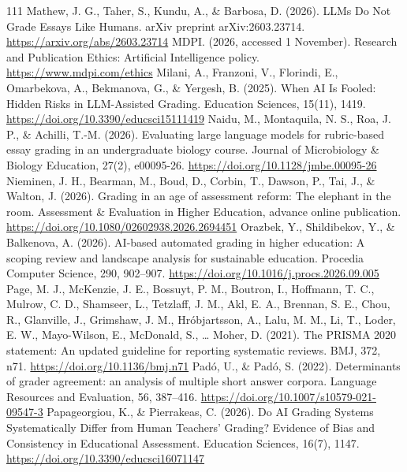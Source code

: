 \begin{thebibliography}{111}
 Mathew, J. G., Taher, S., Kundu, A., \& Barbosa, D. (2026). LLMs Do Not Grade Essays Like Humans. arXiv preprint arXiv:2603.23714. \url{https://arxiv.org/abs/2603.23714}
 MDPI. (2026, accessed 1 November). Research and Publication Ethics: Artificial Intelligence policy. \url{https://www.mdpi.com/ethics}
 Milani, A., Franzoni, V., Florindi, E., Omarbekova, A., Bekmanova, G., \& Yergesh, B. (2025). When AI Is Fooled: Hidden Risks in LLM-Assisted Grading. Education Sciences, 15(11), 1419. \url{https://doi.org/10.3390/educsci15111419}
 Naidu, M., Montaquila, N. S., Roa, J. P., \& Achilli, T.-M. (2026). Evaluating large language models for rubric-based essay grading in an undergraduate biology course. Journal of Microbiology \& Biology Education, 27(2), e00095-26. \url{https://doi.org/10.1128/jmbe.00095-26}
 Nieminen, J. H., Bearman, M., Boud, D., Corbin, T., Dawson, P., Tai, J., \& Walton, J. (2026). Grading in an age of assessment reform: The elephant in the room. Assessment \& Evaluation in Higher Education, advance online publication. \url{https://doi.org/10.1080/02602938.2026.2694451}
 Orazbek, Y., Shildibekov, Y., \& Balkenova, A. (2026). AI-based automated grading in higher education: A scoping review and landscape analysis for sustainable education. Procedia Computer Science, 290, 902--907. \url{https://doi.org/10.1016/j.procs.2026.09.005}
 Page, M. J., McKenzie, J. E., Bossuyt, P. M., Boutron, I., Hoffmann, T. C., Mulrow, C. D., Shamseer, L., Tetzlaff, J. M., Akl, E. A., Brennan, S. E., Chou, R., Glanville, J., Grimshaw, J. M., Hr\'objartsson, A., Lalu, M. M., Li, T., Loder, E. W., Mayo-Wilson, E., McDonald, S., \ldots{} Moher, D. (2021). The PRISMA 2020 statement: An updated guideline for reporting systematic reviews. BMJ, 372, n71. \url{https://doi.org/10.1136/bmj.n71}
 Pad\'{o}, U., \& Pad\'{o}, S. (2022). Determinants of grader agreement: an analysis of multiple short answer corpora. Language Resources and Evaluation, 56, 387--416. \url{https://doi.org/10.1007/s10579-021-09547-3}
 Papageorgiou, K., \& Pierrakeas, C. (2026). Do AI Grading Systems Systematically Differ from Human Teachers' Grading? Evidence of Bias and Consistency in Educational Assessment. Education Sciences, 16(7), 1147. \url{https://doi.org/10.3390/educsci16071147}

\end{thebibliography}
